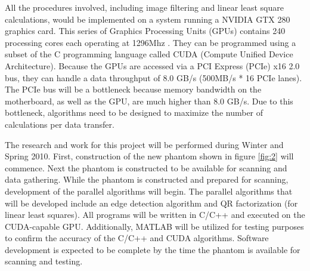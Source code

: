 \documentclass{sbthesis}
\begin{document}
All the procedures involved, including image filtering and linear least square calculations, would be implemented on a system running a NVIDIA GTX 280 graphics card. This series of Graphics Processing Units (GPUs)
contains 240 processing cores each operating at
1296Mhz \cite{GTX280}. They can be programmed using a subset of
the C programming language called CUDA (Compute Unified Device Architecture). Because the
GPUs are accessed via a PCI Express (PCIe) x16 2.0 bus, they can handle a data throughput of
8.0 GB/s (500MB/s * 16 PCIe lanes). The
PCIe bus will be a bottleneck because memory bandwidth on
the motherboard, as well as the GPU, are much higher than 8.0 GB/s. Due to this
bottleneck, algorithms need to be designed to maximize the number of
calculations per data transfer.




The research and work for this project will be performed during Winter and Spring 2010. First,
construction of the new phantom shown in figure \ref{fig:2} will commence. Next the phantom is constructed to be available for scanning and data gathering. While the phantom is constructed and prepared for scanning, development of the parallel algorithms will begin.  The parallel algorithms that will be developed include an edge detection algorithm and QR factorization (for linear least squares). All programs will be written in C/C++ and executed on the CUDA-capable GPU.  Additionally, MATLAB will be utilized for testing purposes to confirm the accuracy of the C/C++ and CUDA algorithms.  Software development is expected to be complete by the time the phantom is available for scanning and testing.
\end{document}
